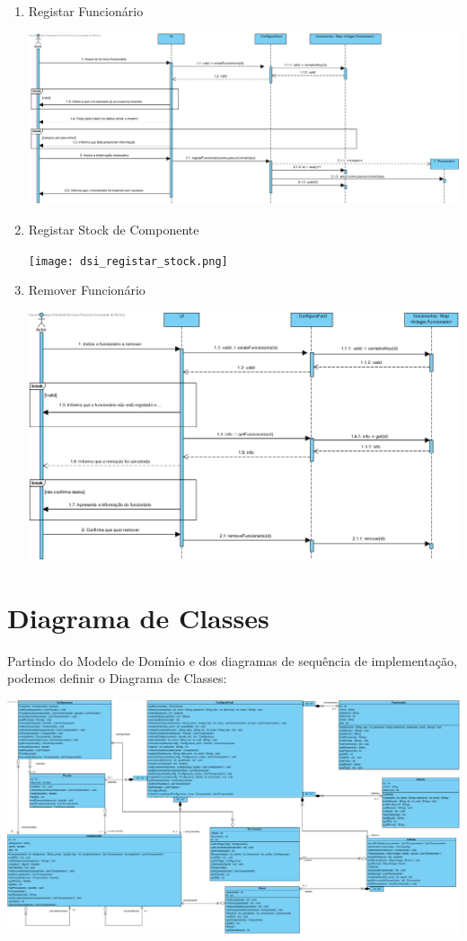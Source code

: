 \documentclass[11pt]{article} %
\begin{document}
\begin{enumerate}
\begin{center}
		\end{center}
	\item Registar Funcionário
		\begin{center}
 			\includegraphics[]{dsi_registar_funcionario.png}
		\end{center}
	\item Registar Stock de Componente
		\begin{center}
 			\texttt{[image: dsi\_registar\_stock.png]}
		\end{center}
	\item Remover Funcionário
		\begin{center}
 			\includegraphics[]{dsi_remover_funcionario.png}
		\end{center}
\end{enumerate}

\section{Diagrama de Classes}
Partindo do Modelo de Domínio e dos diagramas de sequência de implementação, podemos definir o Diagrama de Classes:
\begin{center}
 	\includegraphics[width=6in]{Classes.png}
\end{center}
\end{document}
